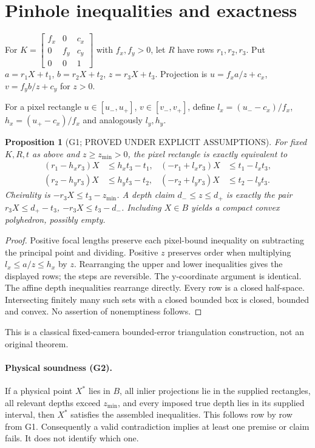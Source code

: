 \documentclass[11pt]{article}
\newtheorem{proposition}{Proposition}
\begin{document}
\section*{Pinhole inequalities and exactness}
For $K=\left[\begin{smallmatrix}f_x&0&c_x\\0&f_y&c_y\\0&0&1\end{smallmatrix}\right]$ with $f_x,f_y>0$, let $R$ have rows $r_1,r_2,r_3$. Put $a=r_1X+t_1$, $b=r_2X+t_2$, $z=r_3X+t_3$. Projection is $u=f_xa/z+c_x$, $v=f_yb/z+c_y$ for $z>0$.

For a pixel rectangle $u\in[u_-,u_+]$, $v\in[v_-,v_+]$, define $l_x=(u_--c_x)/f_x$, $h_x=(u_+-c_x)/f_x$ and analogously $l_y,h_y$.
\begin{proposition}[G1; PROVED UNDER EXPLICIT ASSUMPTIONS]
For fixed $K,R,t$ as above and $z\ge z_{\min}>0$, the pixel rectangle is exactly equivalent to
\begin{align*}
(r_1-h_xr_3)X&\le h_xt_3-t_1,&(-r_1+l_xr_3)X&\le t_1-l_xt_3,\\
(r_2-h_yr_3)X&\le h_yt_3-t_2,&(-r_2+l_yr_3)X&\le t_2-l_yt_3.
\end{align*}
Cheirality is $-r_3X\le t_3-z_{\min}$. A depth claim $d_-\le z\le d_+$ is exactly the pair $r_3X\le d_+-t_3$, $-r_3X\le t_3-d_-$. Including $X\in B$ yields a compact convex polyhedron, possibly empty.
\end{proposition}
\begin{proof}
Positive focal lengths preserve each pixel-bound inequality on subtracting the principal point and dividing. Positive $z$ preserves order when multiplying $l_x\le a/z\le h_x$ by $z$. Rearranging the upper and lower inequalities gives the displayed rows; the steps are reversible. The y-coordinate argument is identical. The affine depth inequalities rearrange directly. Every row is a closed half-space. Intersecting finitely many such sets with a closed bounded box is closed, bounded and convex. No assertion of nonemptiness follows.
\end{proof}
This is a classical fixed-camera bounded-error triangulation construction, not an original theorem.

\paragraph{Physical soundness (G2).}
If a physical point $X^*$ lies in $B$, all inlier projections lie in the supplied rectangles, all relevant depths exceed $z_{\min}$, and every imposed true depth lies in its supplied interval, then $X^*$ satisfies the assembled inequalities. This follows row by row from G1. Consequently a valid contradiction implies at least one premise or claim fails. It does not identify which one.
\end{document}
